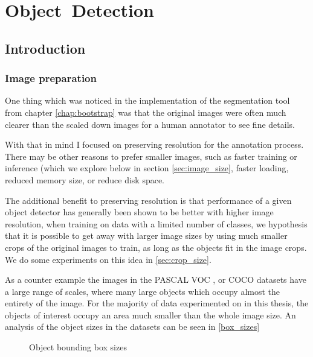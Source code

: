 \chapter{Object~Detection}
\label{chap:detection} 


\section{Introduction}


\subsection {Image preparation}

One thing which was noticed in the implementation of the segmentation tool from chapter \ref{chap:bootstrap} was that the original images were often much clearer than the scaled down images for a human annotator to see fine details.

With that in mind I focused on preserving resolution for the annotation process. There may be other reasons to prefer smaller images, such as faster training or inference (which we explore below in section \ref{sec:image_size}, faster loading, reduced memory size, or reduce disk space. 

The additional benefit to preserving resolution is that performance of a given object detector has generally been shown to be better with higher image resolution, when training on data with a limited number of classes, we hypothesis that it is possible to get away with larger image sizes by using much smaller crops of the original images to train, as long as the objects fit in the image crops. We do some experiments on this idea in \ref{sec:crop_size}.

As a counter example the images in the PASCAL VOC \cite{Everingham}, or COCO\cite{Lin2014} datasets have a large range of scales, where many large objects which occupy almost the entirety of the image. For the majority of data experimented on in this thesis, the objects of interest occupy an area much smaller than the whole image size. An analysis of the object sizes in the datasets can be seen in \ref {box_sizes}



\begin{figure}[ht]
\centering

\caption{Object bounding box sizes}
\label{fig:box_sizes}
\end{figure}



